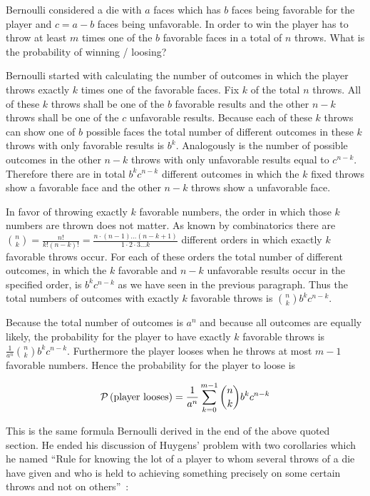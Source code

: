 Bernoulli considered a die with $a$ faces which has $b$ faces being favorable for the player and $c=a-b$ faces being unfavorable. In order to win the player has to throw at least $m$ times one of the $b$ favorable faces in a total of $n$ throws. What is the probability of winning / loosing?

Bernoulli started with calculating the number of outcomes in which the player throws exactly $k$ times one of the favorable faces. Fix $k$ of the total $n$ throws. All of these $k$ throws shall be one of the $b$ favorable results and the other $n-k$ throws shall be one of the $c$ unfavorable results. Because each of these $k$ throws can show one of $b$ possible faces the total number of different outcomes in these $k$ throws with only favorable results is $b^k$. Analogously is the number of possible outcomes in the other $n-k$ throws with only unfavorable results equal to $c^{n-k}$. Therefore there are in total $b^kc^{n-k}$ different outcomes in which the $k$ fixed throws show a favorable face and the other $n-k$ throws show a unfavorable face.

In favor of throwing exactly $k$ favorable numbers, the order in which those $k$ numbers are thrown does not matter. As known by combinatorics there are $\binom nk=\frac{n!}{k!(n-k)!}=\frac{n\cdot(n-1)\ldots(n-k+1)}{1\cdot2\cdot3\ldots k}$ different orders in which exactly $k$ favorable throws occur. For each of these orders the total number of different outcomes, in which the $k$ favorable and $n-k$ unfavorable results occur in the specified order, is $b^kc^{n-k}$ as we have seen in the previous paragraph. Thus the total numbers of outcomes with exactly $k$ favorable throws is $\binom nk b^k c^{n-k}$.

Because the total number of outcomes is $a^n$ and because all outcomes are equally likely, the probability for the player to have exactly $k$ favorable throws is $\frac {1}{a^n} \binom nk b^k c^{n-k}$. Furthermore the player looses when he throws at most $m-1$ favorable numbers. Hence the probability for the player to loose is

\begin{align}
  \P{\text{player looses}} = \frac{1}{a^n} \sum_{k=0}^{m-1} \binom nk b^k c^{n-k}
\end{align}

This is the same formula Bernoulli derived in the end of the above quoted section. He ended his discussion of Huygens' problem with two corollaries which he named ``Rule for knowing the lot of a player to whom several throws of a die have given and who is held to achieving something precisely on some certain throws and not on others''~\cite[p. 170]{bernoulli}:

